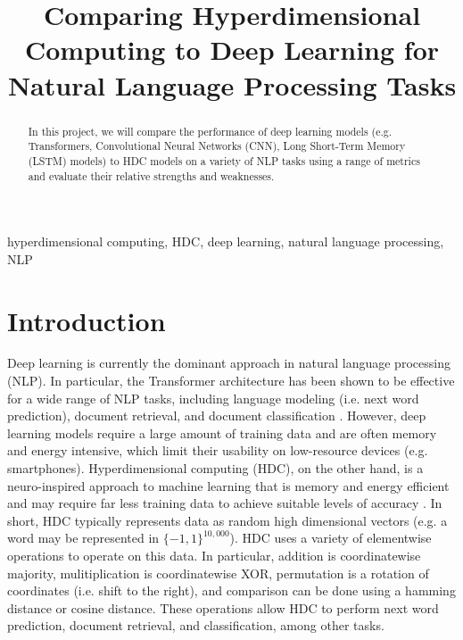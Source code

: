 \documentclass[conference]{IEEEtran}
\begin{document}
\title{Comparing Hyperdimensional Computing to Deep Learning for Natural Language Processing Tasks}

\author{
\and
{}
}

\maketitle

\begin{abstract}
    In this project, we will compare the performance of deep learning models (e.g. Transformers, Convolutional Neural Networks (CNN), Long Short-Term Memory (LSTM) models) to HDC models on a variety of NLP tasks using a range of metrics and evaluate their relative strengths and weaknesses.
\end{abstract}

\begin{IEEEkeywords}
hyperdimensional computing, HDC, deep learning, natural language processing, NLP
\end{IEEEkeywords}

\section{Introduction}
Deep learning is currently the dominant approach in natural language processing (NLP). In particular, the Transformer \cite{Transformer} architecture has been shown to be effective for a wide range of NLP tasks, including language modeling (i.e. next word prediction), document retrieval, and document classification \cite{SuperGLUE}. However, deep learning models require a large amount of training data and are often memory and energy intensive, which limit their usability on low-resource devices (e.g. smartphones). Hyperdimensional computing (HDC), on the other hand, is a neuro-inspired approach to machine learning that is memory and energy efficient and may require far less training data to achieve suitable levels of accuracy \cite{HDC}. In short, HDC typically represents data as random high dimensional vectors (e.g. a word may be represented in $\{-1, 1\}^{10,000}$). HDC uses a variety of elementwise operations to operate on this data. In particular, addition is coordinatewise majority, mulitiplication is coordinatewise XOR, permutation is a rotation of coordinates (i.e. shift to the right), and comparison can be done using a hamming distance or cosine distance. These operations allow HDC to perform next word prediction, document retrieval, and classification, among other tasks.
\end{document}
